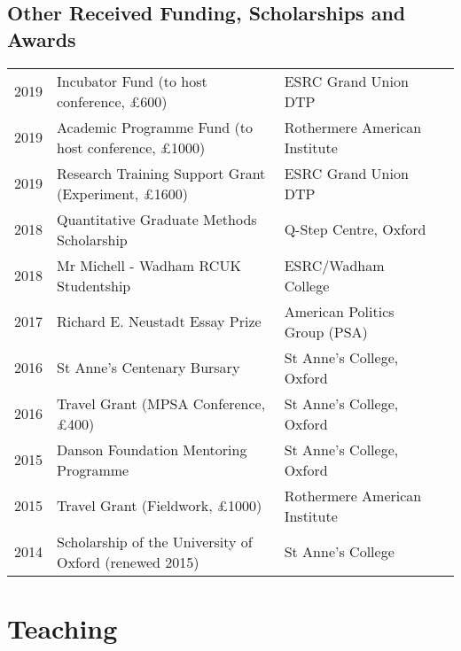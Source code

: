 \documentclass[11pt, a4paper]{article}
\begin{document}
   

\subsection*{Other Received Funding, Scholarships and Awards}
 \begin{tabular}{llll}
     2019 & Incubator Fund (to host conference, £600) & ESRC Grand Union DTP \\
     2019 & Academic Programme Fund (to host conference, £1000) & Rothermere American Institute \\
     2019 & Research Training Support Grant (Experiment, £1600) & ESRC Grand Union DTP \\
     2018 & Quantitative Graduate Methods Scholarship & Q-Step Centre, Oxford \\
     2018 & Mr Michell - Wadham RCUK Studentship & ESRC/Wadham College\\
     2017 & Richard E. Neustadt Essay Prize & American Politics Group (PSA) \\
     2016 & St Anne's Centenary Bursary & St Anne's College, Oxford \\
     2016 & Travel Grant (MPSA Conference, £400) & St Anne's College, Oxford \\
     2015 & Danson Foundation Mentoring Programme & St Anne's College, Oxford \\
     2015 & Travel Grant (Fieldwork, £1000) & Rothermere American Institute \\
     2014 & Scholarship of the University of Oxford (renewed 2015) & St Anne's College

 \end{tabular}

 \section*{Teaching}
\end{document}

